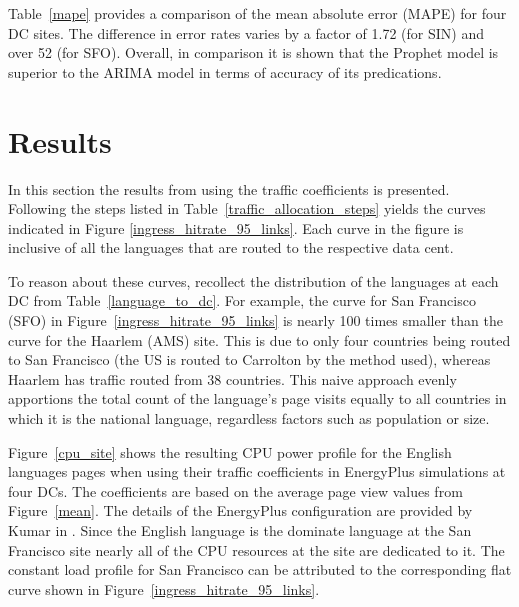     
    
    Table~\ref{mape} provides a comparison of the mean absolute error (MAPE) for four DC sites. The difference in error rates varies by a factor of 1.72 (for SIN) and over 52 (for SFO). Overall, in comparison it is shown that the Prophet model is superior to the ARIMA model in terms of accuracy of its predications. 
    
    
\section {Results}

    In this section the results from using the traffic coefficients is presented. Following the steps listed in Table~\ref{traffic_allocation_steps} yields the curves indicated in Figure \ref{ingress_hitrate_95_links}. Each curve in the figure is inclusive of all the languages that are routed to the respective data cent. 
    
    To reason about these curves, recollect the distribution of the languages at each DC from Table~\ref{language_to_dc}. For example, the curve for San Francisco (SFO) in Figure~\ref{ingress_hitrate_95_links} is nearly 100 times smaller than the curve for the Haarlem (AMS) site. This is due to only four countries being routed to San Francisco (the US is routed to Carrolton by the method used), whereas Haarlem has traffic routed from 38 countries. This naive approach evenly apportions the total count of the language's page visits equally to all countries in which it is the national language, regardless factors such as population or size.   
    
    Figure~\ref{cpu_site} shows the resulting CPU power profile for the English languages pages when using their traffic coefficients in EnergyPlus simulations at four DCs. The coefficients are based on the average page view values from Figure~\ref{mean}. The details of the EnergyPlus configuration are provided by Kumar in \cite{kumar20, kumar20b}. Since the English language is the dominate language at the San Francisco site nearly all of the CPU resources at the site are dedicated to it. The constant load profile for San Francisco can be attributed to the corresponding flat curve shown in Figure~\ref{ingress_hitrate_95_links}. 
    
    
    
